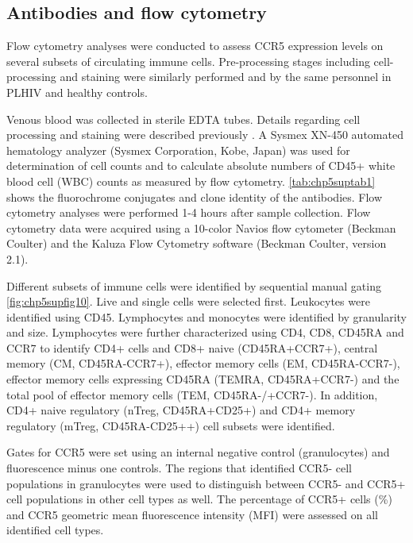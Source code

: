 \documentclass{book}
\begin{document}
\begin{refsection}
\subsection*{Antibodies and flow cytometry}
Flow cytometry analyses were conducted to assess CCR5 expression levels on several subsets of circulating immune cells.
Pre-processing stages including cell-processing and staining were similarly performed and by the same personnel in PLHIV and healthy controls.

Venous blood was collected in sterile EDTA tubes.
Details regarding cell processing and staining were described previously \cite{Aguirre2016Differential}.
A Sysmex XN-450 automated hematology analyzer (Sysmex Corporation, Kobe, Japan) was used for determination of cell counts and to calculate absolute numbers of CD45+ white blood cell (WBC) counts as measured by flow cytometry.
\ref{tab:chp5suptab1} shows the fluorochrome conjugates and clone identity of the antibodies.
Flow cytometry analyses were performed 1-4 hours after sample collection.
Flow cytometry data were acquired using a 10-color Navios flow cytometer (Beckman Coulter) and the Kaluza Flow Cytometry software (Beckman Coulter, version 2.1).

Different subsets of immune cells were identified by sequential manual gating \ref{fig:chp5supfig10}.
Live and single cells were selected first.
Leukocytes were identified using CD45.
Lymphocytes and monocytes were identified by granularity and size.
Lymphocytes were further characterized using CD4, CD8, CD45RA and CCR7 to identify CD4+ cells and CD8+ naive (CD45RA+CCR7+), central memory (CM, CD45RA-CCR7+), effector memory cells (EM, CD45RA-CCR7-), effector memory cells expressing CD45RA (TEMRA, CD45RA+CCR7-) and the total pool of effector memory cells (TEM, CD45RA-/+CCR7-).%
In addition, CD4+ naive regulatory (nTreg, CD45RA+CD25+) and CD4+ memory regulatory (mTreg, CD45RA-CD25++) cell subsets were identified.

Gates for CCR5 were set using an internal negative control (granulocytes) and fluorescence minus one controls.
The regions that identified CCR5- cell populations in granulocytes were used to distinguish between CCR5- and CCR5+ cell populations in other cell types as well.
The percentage of CCR5+ cells (\%) and CCR5 geometric mean fluorescence intensity (MFI) were assessed on all identified cell types.


\end{refsection}
\end{document}
